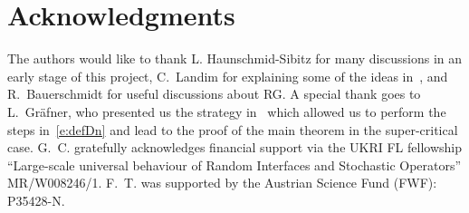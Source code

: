 \documentclass[reqno,11pt]{preprint}
\newcommand{\J}{\mathbb{J}}
\newcommand{\cA}{\mathcal{A}}
\newcommand{\cF}{\mathcal{F}}
\newcommand{\cN}{\mathcal{N}}
\newcommand{\1}{\mathds{1}}
\def\indN#1{{	\J^\eps_{#1}	}}
\newcommand{\fock}{\Gamma L^2}	%
\newcommand{\gena}{\cA^{\eps}}
\newcommand{\NN}{\cN^\eps}
\begin{document}
%
%
%
%
%

\section*{Acknowledgments} 
The authors would like to thank L. Haunschmid-Sibitz for many
discussions in an early stage of this project, C.~Landim for
explaining some of the ideas in~\cite{Komorowski2012}, and R.~Bauerschmidt for useful discussions about RG.  A
special thank goes to L.~Gr\"afner, who presented us the strategy
in~\cite{GrPer} which allowed us to perform the steps
in~\eqref{e:defDn} and lead to the proof of the main theorem in the
super-critical case.  G.~C. gratefully acknowledges financial support
via the UKRI FL fellowship ``Large-scale universal behaviour of Random
Interfaces and Stochastic Operators'' MR/W008246/1.  F.~T.  was
supported by the Austrian Science Fund (FWF): P35428-N.



\end{document}
